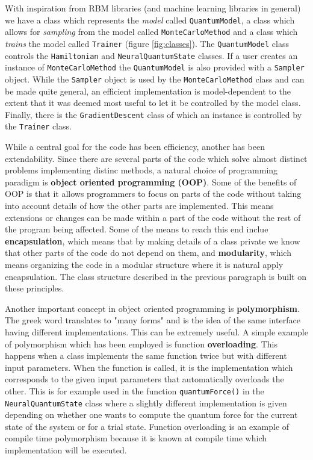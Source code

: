 \documentclass[twoside,english]{uiofysmaster}
\begin{document}
With inspiration from RBM libraries (and machine learning libraries in general) we have a class which represents the \textit{model} called \texttt{QuantumModel}, a class which allows for \textit{sampling} from the model called \texttt{MonteCarloMethod} and a class which \textit{trains} the model called \texttt{Trainer} (figure \ref{fig:classes}). The \texttt{QuantumModel} class controls the \texttt{Hamiltonian} and \texttt{NeuralQuantumState} classes. If a user creates an instance of \texttt{MonteCarloMethod} the \texttt{QuantumModel} is also provided with a \texttt{Sampler} object. While the \texttt{Sampler} object is used by the \texttt{MonteCarloMethod} class and can be made quite general, an efficient implementation is model-dependent to the extent that it was deemed most useful to let it be controlled by the model class. Finally, there is the \texttt{GradientDescent} class of which an instance is controlled by the \texttt{Trainer} class.

While a central goal for the code has been efficiency, another has been extendability. Since there are several parts of the code which solve almost distinct problems implementing distinc methods, a natural choice of programming paradigm is \textbf{object oriented programming (OOP)}. Some of the benefits of OOP is that it allows programmers to focus on parts of the code without taking into account details of how the other parts are implemented. This means extensions or changes can be made within a part of the code without the rest of the program being affected. Some of the means to reach this end inclue \textbf{encapsulation}, which means that by making details of a class private we know that other parts of the code do not depend on them, and \textbf{modularity}, which means organizing the code in a modular structure where it is natural apply encapsulation. The class structure described in the previous paragraph is built on these principles. 

Another important concept in object oriented programming is \textbf{polymorphism}. The greek word translates to "many forms" and is the idea of the same interface having different implementations. This can be extremely useful. 
A simple example of polymorphism which has been employed is function \textbf{overloading}. This happens when a class implements the same function twice but with different input parameters. When the function is called, it is the implementation which corresponds to the given input parameters that automatically overloads the other. This is for example used in the function \texttt{quantumForce()} in the \texttt{NeuralQuantumState} class where a slightly different implementation is given depending on whether one wants to compute the quantum force for the current state of the system or for a trial state. Function overloading is an example of compile time polymorphism because it is known at compile time which implementation will be executed.
\end{document}

